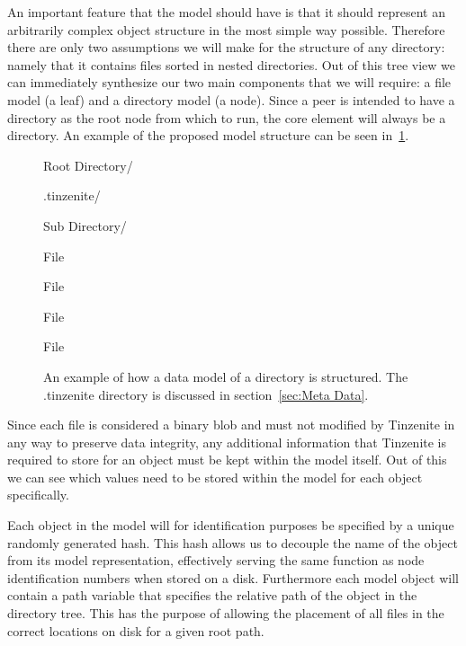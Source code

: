 An important feature that the model should have is that it should represent an arbitrarily complex object structure in the most simple way possible.
Therefore there are only two assumptions we will make for the structure of any directory: namely that it contains files sorted in nested directories.
Out of this tree view we can immediately synthesize our two main components that we will require: a file model (a leaf) and a directory model (a node).
Since a peer is intended to have a directory as the root node from which to run, the core element will always be a directory.
An example of the proposed model structure can be seen in~\ref{list:model}.

\begin{figure}[htp]
\begin{modellist}
\item Root Directory/
    \begin{modellist}
        \item .tinzenite/
        \item Sub Directory/
            \begin{modellist}
                \item File
                \item File
            \end{modellist}
        \item File
        \item File
    \end{modellist}
\end{modellist}
\caption[Data Model Example Structure]{An example of how a data model of a directory is structured. The .tinzenite directory is discussed in section~\ref{sec:Meta Data}.}
\label{list:model}
\end{figure}

Since each file is considered a binary blob and must not modified by Tinzenite in any way to preserve data integrity, any additional information that Tinzenite is required to store for an object must be kept within the model itself.
Out of this we can see which values need to be stored within the model for each object specifically.

Each object in the model will for identification purposes be specified by a unique randomly generated hash.
This hash allows us to decouple the name of the object from its model representation, effectively serving the same function as node identification numbers when stored on a disk.
Furthermore each model object will contain a path variable that specifies the relative path of the object in the directory tree.
This has the purpose of allowing the placement of all files in the correct locations on disk for a given root path.

